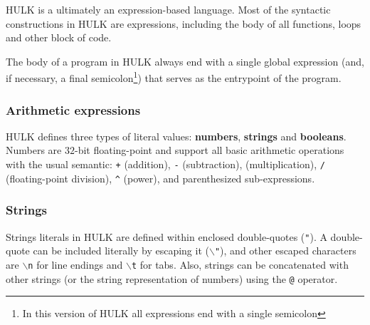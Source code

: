 \documentclass[a4paper, 12pt]{report}
\begin{document}
HULK is a ultimately an expression-based language. Most of the syntactic constructions in HULK are expressions,
including the body of all functions, loops and other block of code.

The body of a program in HULK always end with a single global expression (and, if necessary, a final semicolon\footnote{In this
  version of HULK all expressions end with a single semicolon}) that serves as the entrypoint of the program.

\subsubsection*{Arithmetic expressions}

HULK defines three types of literal values: {\bf numbers}, {\bf strings} and {\bf booleans}. Numbers are $32$-bit floating-point
and support all basic arithmetic operations with the usual semantic: {\tt +} (addition), {\tt -} (subtraction), {\tt *} (multiplication),
{\tt \slash} (floating-point division), {\tt \^{}} (power), and parenthesized sub-expressions.

\subsubsection*{Strings}

Strings literals in HULK are defined within enclosed double-quotes ({\tt "}). A double-quote
can be included literally by escaping it ($\backslash${\tt "}), and other escaped characters
are $\backslash${\tt n} for line endings and $\backslash${\tt t} for tabs. Also, strings can
be concatenated with other strings (or the string representation of numbers) using the {\tt @}
operator.
\end{document}
